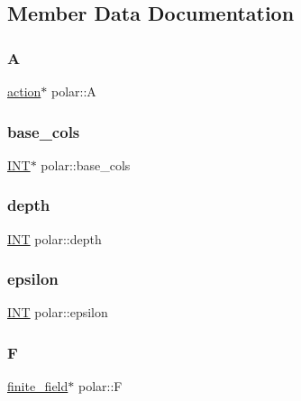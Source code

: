 \subsection{Member Data Documentation}
\mbox{\label{classpolar_ae4527a218b7c5f8d48466036e765f54b}} 
\subsubsection{\texorpdfstring{A}{A}}
{\footnotesize\ttfamily \mbox{\hyperlink{classaction}{action}}$\ast$ polar\+::A}

\mbox{\label{classpolar_a4e6b171c90dffd5689d72f8a6e74a527}} 
\subsubsection{\texorpdfstring{base\+\_\+cols}{base\_cols}}
{\footnotesize\ttfamily \mbox{\hyperlink{galois_8h_a09fddde158a3a20bd2dcadb609de11dc}{I\+NT}}$\ast$ polar\+::base\+\_\+cols}

\mbox{\label{classpolar_aba640afc6544afd704f9fd8bd4ad74f6}} 
\subsubsection{\texorpdfstring{depth}{depth}}
{\footnotesize\ttfamily \mbox{\hyperlink{galois_8h_a09fddde158a3a20bd2dcadb609de11dc}{I\+NT}} polar\+::depth}

\mbox{\label{classpolar_ad130d95a664e916e0731e1ccf97e0ba9}} 
\subsubsection{\texorpdfstring{epsilon}{epsilon}}
{\footnotesize\ttfamily \mbox{\hyperlink{galois_8h_a09fddde158a3a20bd2dcadb609de11dc}{I\+NT}} polar\+::epsilon}

\mbox{\label{classpolar_aaa9e42afe43d749e5dd101f15c264791}} 
\subsubsection{\texorpdfstring{F}{F}}
{\footnotesize\ttfamily \mbox{\hyperlink{classfinite__field}{finite\+\_\+field}}$\ast$ polar\+::F}

